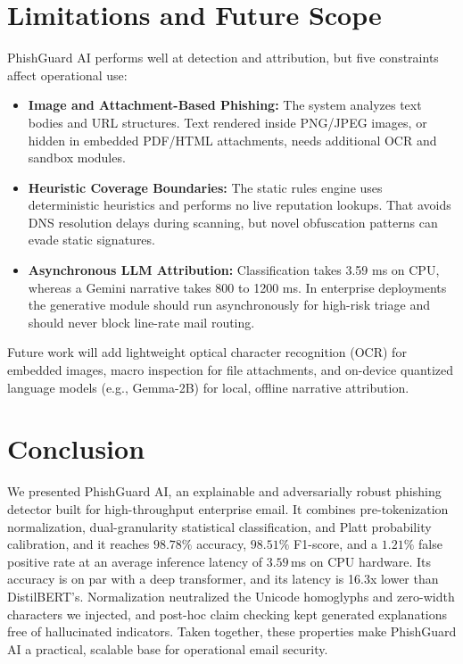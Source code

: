 \documentclass[conference]{IEEEtran}
\begin{document}
\section{Limitations and Future Scope}
\label{sec:limits}

PhishGuard AI performs well at detection and attribution, but five constraints affect operational use:
\begin{itemize}
    \item \textbf{Image and Attachment-Based Phishing:} The system analyzes text bodies and URL structures. Text rendered inside PNG/JPEG images, or hidden in embedded PDF/HTML attachments, needs additional OCR and sandbox modules.
    \item \textbf{Heuristic Coverage Boundaries:} The static rules engine uses deterministic heuristics and performs no live reputation lookups. That avoids DNS resolution delays during scanning, but novel obfuscation patterns can evade static signatures.
    \item \textbf{Asynchronous LLM Attribution:} Classification takes 3.59 ms on CPU, whereas a Gemini narrative takes 800 to 1200 ms. In enterprise deployments the generative module should run asynchronously for high-risk triage and should never block line-rate mail routing.
\end{itemize}

Future work will add lightweight optical character recognition (OCR) for embedded images, macro inspection for file attachments, and on-device quantized language models (e.g., Gemma-2B) for local, offline narrative attribution.

\section{Conclusion}
\label{sec:conclusion}

We presented PhishGuard AI, an explainable and adversarially robust phishing detector built for high-throughput enterprise email. It combines pre-tokenization normalization, dual-granularity statistical classification, and Platt probability calibration, and it reaches $98.78\%$ accuracy, $98.51\%$ F1-score, and a $1.21\%$ false positive rate at an average inference latency of $3.59$\,ms on CPU hardware. Its accuracy is on par with a deep transformer, and its latency is 16.3x lower than DistilBERT's. Normalization neutralized the Unicode homoglyphs and zero-width characters we injected, and post-hoc claim checking kept generated explanations free of hallucinated indicators. Taken together, these properties make PhishGuard AI a practical, scalable base for operational email security.
\end{document}
